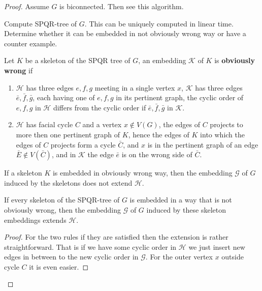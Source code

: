 \begin{proof}
	Assume $G$ is biconnected. Then see this algorithm.
	
	\begin{algorithm}[!ht]
		\begin{algorithmic}[1]
			\State Compute SPQR-tree of $G$. This can be uniquely computed in linear time.
				\State \Return
			\EndIf
				\State Determine whether it can be embedded in not obviously wrong way or have a counter example.
			\EndFor
		\end{algorithmic}
	\end{algorithm}

	\begin{defn}
		Let $K$ be a skeleton of the SPQR tree of $G$, an embedding $\mathcal{K}$ of $K$ is \textbf{obviously wrong} if
		
		\begin{enumerate}
			\item $\mathcal{H}$ has three edges $e,f,g$ meeting in a single vertex $x$, $\mathcal{K}$ has three edges $\bar{e}, \bar{f}, \bar{g}$, each having one of $e,f,g$ in its pertinent graph, the cyclic order of $e,f,g$ in $\mathcal{H}$ differs from the cyclic order if $\bar{e}, \bar{f}, \bar{g}$ in $\mathcal{K}$.
			\item $\mathcal{H}$ has facial cycle $C$ and a vertex $x \notin V(G)$, the edges of $C$ projects to more then one pertinent graph of $K$, hence the edges of $K$ into which the edges of $C$ projects form a cycle $\bar{C}$, and $x$ is in the pertinent graph of an edge $\bar{E} \notin V(\bar{C})$, and in $\mathcal{K}$ the edge $\bar{e}$ is on the wrong side of $\bar{C}$. 
		\end{enumerate}
	\end{defn}

	\begin{observ}
		If a skeleton $K$ is embedded in obviously wrong way, then the embedding $\mathcal{G}$ of $G$ induced by the skeletons does not extend $\mathcal{H}$.
	\end{observ}

	\begin{thm}
		If every skeleton of the SPQR-tree of $G$ is embedded in a way that is not obviously wrong, then the embedding $\mathcal{G}$ of $G$ induced by these skeleton embeddings extends $\mathcal{H}$.
	\end{thm}

	\begin{proof}
		For the two rules if they are satisfied then the extension is rather straightforward. That is if we have some cyclic order in $\mathcal{H}$ we just insert new edges in between to the new cyclic order in $\mathcal{G}$. For the outer vertex $x$ outside cycle $C$ it is even easier.
		

\end{proof}
\end{proof}
